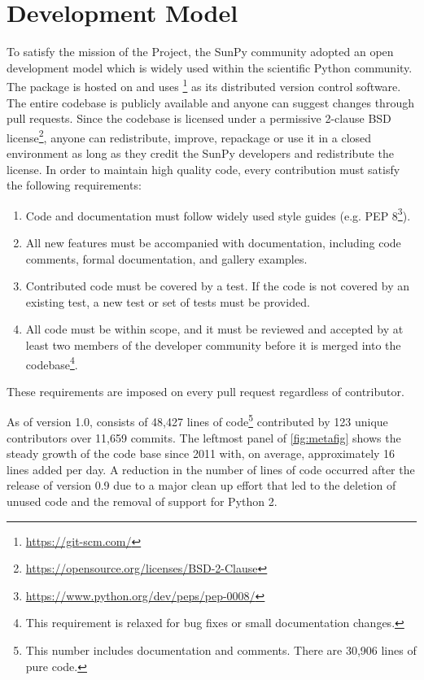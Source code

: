 \section{Development Model}
\label{sec:development}

To satisfy the mission of the Project, the SunPy community adopted an open development model which is widely used within the scientific Python community.
The \sunpypkg package is hosted on \github and uses \footnote{\url{https://git-scm.com/}} as its distributed version control software.
The entire codebase is publicly available and anyone can suggest changes through pull requests.
Since the codebase is licensed under a permissive 2-clause BSD license\footnote{\url{https://opensource.org/licenses/BSD-2-Clause}}, anyone can redistribute, improve, repackage or use it in a closed environment as long as they credit the SunPy developers and redistribute the license.
In order to maintain high quality code, every contribution must satisfy the following requirements:
\begin{enumerate}
    \item Code and documentation must follow widely used style guides (e.g. PEP 8\footnote{\url{https://www.python.org/dev/peps/pep-0008/}}).
    \item All new features must be accompanied with documentation, including code comments, formal documentation, and gallery examples.
    \item Contributed code must be covered by a test. If the code is not covered by an existing test, a new test or set of tests must be provided.
    \item All code must be within scope, and it must be reviewed and accepted by at least two members of the developer community before it is merged into the codebase\footnote{This requirement is relaxed for bug fixes or small documentation changes.}.
\end{enumerate}
These requirements are imposed on every pull request regardless of contributor.

As of version 1.0, \sunpypkg consists of 48,427 lines of code\footnote{This number includes documentation and comments.
There are 30,906 lines of pure code.} contributed by 123 unique contributors over 11,659 \git commits.
The leftmost panel of \autoref{fig:metafig} shows the steady growth of the code base since 2011 with, on average, approximately 16 lines added per day.
A reduction in the number of lines of code occurred after the release of version 0.9 due to a major clean up effort that led to the deletion of unused code and the removal of support for Python 2.

